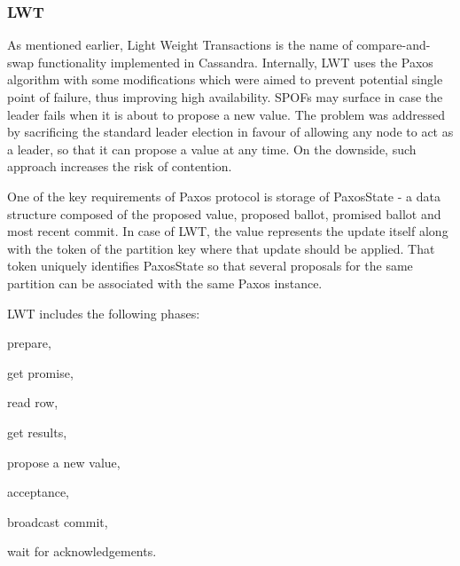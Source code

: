 \subsubsection{LWT}\label{sec:theory:transactions:lwt}
As mentioned earlier, Light Weight Transactions is the name of compare-and-swap functionality implemented in Cassandra. Internally, LWT uses the Paxos algorithm with some modifications which were aimed to prevent potential single point of failure, thus improving high availability. SPOFs may surface in case the leader fails when it is about to propose a new value. The problem was addressed by sacrificing the standard leader election in favour of allowing any node to act as a leader, so that it can propose a value at any time. On the downside, such approach increases the risk of contention. 

One of the key requirements of Paxos protocol is storage of PaxosState - a data structure composed of the proposed value, proposed ballot, promised ballot and most recent commit. In case of LWT, the value represents the update itself along with the token of the partition key where that update should be applied. That token uniquely identifies PaxosState so that several proposals for the same partition can be associated with the same Paxos instance. 


LWT includes the following phases: \begin{enumerate*}
\item prepare,
\item get promise,
\item read row,
\item get results,
\item propose a new value,
\item acceptance,
\item broadcast commit,
\item wait for acknowledgements.
\end{enumerate*} 

